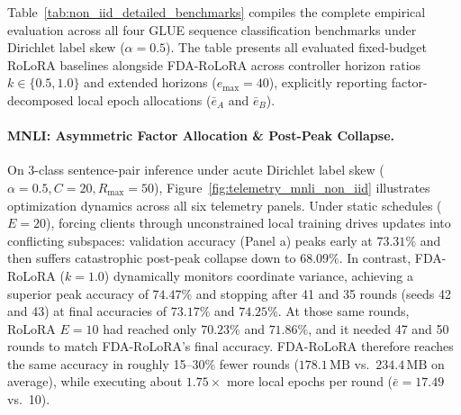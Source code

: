 Table~\ref{tab:non_iid_detailed_benchmarks} compiles the complete empirical evaluation across all four GLUE sequence classification benchmarks under Dirichlet label skew ($\alpha=0.5$). The table presents all evaluated fixed-budget RoLoRA baselines alongside FDA-RoLoRA across controller horizon ratios $k \in \{0.5, 1.0\}$ and extended horizons ($e_{\max}=40$), explicitly reporting factor-decomposed local epoch allocations ($\bar{e}_A$ and $\bar{e}_B$).



\paragraph{MNLI: Asymmetric Factor Allocation \& Post-Peak Collapse.}
On 3-class sentence-pair inference under acute Dirichlet label skew ($\alpha=0.5, C=20, R_{\max}=50$), Figure~\ref{fig:telemetry_mnli_non_iid} illustrates optimization dynamics across all six telemetry panels. Under static schedules ($E=20$), forcing clients through unconstrained local training drives updates into conflicting subspaces: validation accuracy (Panel a) peaks early at $73.31\%$ and then suffers catastrophic post-peak collapse down to $68.09\%$. In contrast, FDA-RoLoRA ($k=1.0$) dynamically monitors coordinate variance, achieving a superior peak accuracy of $\mathbf{74.47\%}$ and stopping after 41 and 35 rounds (seeds 42 and 43) at final accuracies of $73.17\%$ and $74.25\%$. At those same rounds, RoLoRA $E=10$ had reached only $70.23\%$ and $71.86\%$, and it needed 47 and 50 rounds to match FDA-RoLoRA's final accuracy. FDA-RoLoRA therefore reaches the same accuracy in roughly 15--30\% fewer rounds ($178.1\,\text{MB}$ vs.\ $234.4\,\text{MB}$ on average), while executing about $1.75\times$ more local epochs per round ($\bar{e}=17.49$ vs.\ 10). 

